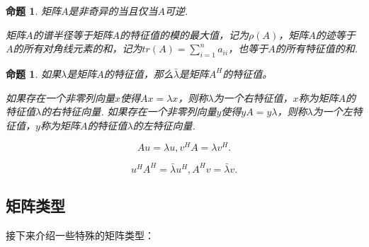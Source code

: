 \documentclass{article}
\begin{document}
\newtheorem{proposition}{命题}
\begin{proposition}
矩阵$A$是非奇异的当且仅当$A$可逆.

矩阵$A$的谱半径等于矩阵$A$的特征值的模的最大值，记为$\rho (A)$，矩阵$A$的迹等于$A$的所有对角线元素的和，记为$tr(A)=\sum_{i=1}^n a_{ii}$，也等于$A$的所有特征值的和.
\end{proposition}

\newtheorem{proposition}{命题}
\begin{proposition}
如果$\lambda$是矩阵$A$的特征值，那么$\bar\lambda$是矩阵$A^H$的特征值。

如果存在一个非零列向量$x$使得$Ax=\lambda x$，则称$\lambda $为一个右特征值，$x$称为矩阵$A$的特征值$\lambda $的右特征向量.
如果存在一个非零列向量$y$使得$yA=y\lambda$，则称$\lambda $为一个左特征值，$y$称为矩阵$A$的特征值$\lambda $的左特征向量.

$$Au=\lambda u,v^HA=\lambda v^H.$$

$$u^HA^H=\bar{\lambda}u^H,A^Hv=\bar{\lambda}v.$$
\end{proposition}

\subsection{矩阵类型}
接下来介绍一些特殊的矩阵类型：
\end{document}
